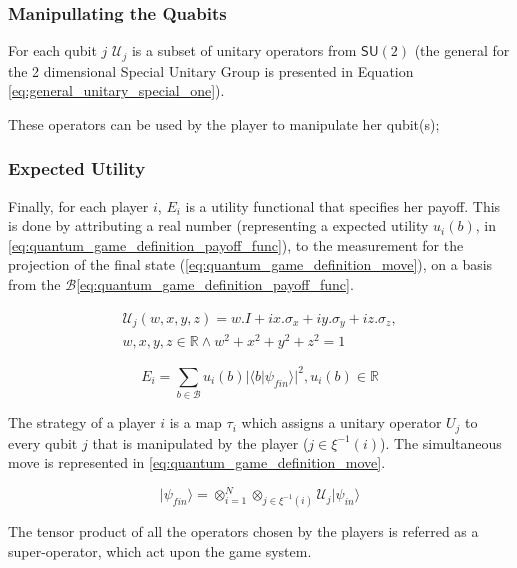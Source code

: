 \documentclass[10pt,twocolumn]{llncs}
\begin{document}
\subsubsection{Manipullating the Quabits} For each qubit $j$ $\mathcal{U}_{j}$ is a subset of unitary operators from $\mathsf{SU}(2)$ (the general for the 2 dimensional Special Unitary Group is presented in Equation \ref{eq:general_unitary_special_one}).

These operators can be used by the player to manipulate her qubit(s);

\subsubsection{Expected Utility} Finally, for each player $i$, $E_{i}$ is a utility functional that
specifies her payoff. This is done by attributing a real number (representing a expected utility $ u_{i}(b)$, in \ref{eq:quantum_game_definition_payoff_func}), to the measurement for the projection of the final state (\ref{eq:quantum_game_definition_move}), on a basis from the $\mathcal{B}$\ref{eq:quantum_game_definition_payoff_func}.

\begin{equation}
\begin{split}
\mathcal{U}_{j}(w,x,y,z)=w.I + ix.\sigma_{x} + iy.\sigma_{y} + iz.\sigma_{z}, \\  w,x,y,z \in \mathbb{R} \wedge  
w^2 + x^2 + y^2 + z^2 =1 
\end{split}
\label{eq:general_unitary_special_one}
\end{equation}

\begin{equation}
E_{i}=\sum_{b \in \mathcal{B}} u_{i}(b)\vert \langle b\vert \psi_{fin}\rangle\vert^{2}, u_{i}(b) \in \mathbb{R}
\label{eq:quantum_game_definition_payoff_func}
\end{equation}

The strategy of a player $i$ is a map $\tau_{i}$ which assigns a
unitary operator $U_{j}$ to every qubit $j$ that is manipulated
by the player ({$j$$\in\xi^{-1}(i)$}).
The simultaneous move is represented in \ref{eq:quantum_game_definition_move}.

\begin{equation}
\vert\psi_{fin}\rangle=\otimes_{i=1}^{N}\otimes_{j\in\xi^{-1}(i)}\mathcal{U}_{j}\vert\psi_{in}\rangle
\label{eq:quantum_game_definition_move}
\end{equation}

The tensor product of all the operators chosen by the players is referred as a super-operator, which act upon the game system.
\end{document}
